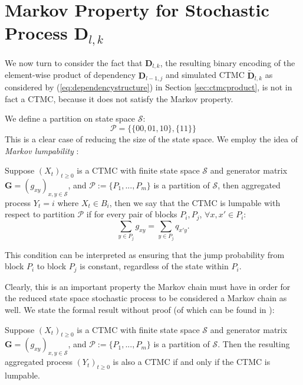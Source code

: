 \section{Markov Property for Stochastic Process $\mathbf{D}_{l, k}$}
\label{app:ctmcprodmarkov}

We now turn to consider the fact that $\mathbf{D}_{l, k}$, the resulting binary encoding of the element-wise product of dependency $\mathbf{D}_{l-1, j}$ and simulated CTMC $\tilde{\mathbf{D}}_{l, k}$ as considered by (\ref{eq:dependencystructure}) in Section \ref{sec:ctmcproduct}, is not in fact a CTMC, because it does not satisfy the Markov property.

We define a partition on state space $\mathcal{S}$:
\begin{equation}
\label{eq:lumpability}
    \mathcal{P} = \{\{00, 01, 10\},\{11\}\}
\end{equation}
This is a clear case of reducing the size of the state space. We employ the idea of \textit{Markov lumpability} \cite{Kemedy1976}:
\begin{definition} [Lumpability]
Suppose $(X_t)_{t\geq 0}$ is a CTMC with finite state space $\mathcal{S}$ and generator matrix $\mathbf{G} = (g_{xy})_{x, y \in \mathcal{S}}$, and $\mathcal{P} := \{P_1, ..., P_m\}$ is a partition of $\mathcal{S}$, then aggregated process $Y_t = i$ where $X_t \in B_i$, then we say that the CTMC is lumpable with respect to partition $\mathcal{P}$ if for every pair of blocks $P_i, P_j$, $\forall x, x' \in P_i$:
\begin{equation}
    \sum_{y\in P_j}g_{xy} = \sum_{y \in P_j}q_{x'y}.
\end{equation}
\end{definition}
This condition can be interpreted as ensuring that the jump probability from block $P_i$ to block $P_j$ is constant, regardless of the state within $P_i$. 

Clearly, this is an important property the Markov chain must have in order for the reduced state space stochastic process to be considered a Markov chain as well. We state the formal result without proof (of which can be found in \cite{Kemedy1976}):
\begin{proposition} 
\label{prop:markovprocesses}
Suppose $(X_t)_{t\geq 0}$ is a CTMC with finite state space $\mathcal{S}$ and generator matrix $\mathbf{G} = (g_{xy})_{x, y \in \mathcal{S}}$, and $\mathcal{P} := \{P_1, ..., P_m\}$ is a partition of $\mathcal{S}$. Then the resulting aggregated process $(Y_t)_{t\geq0}$ is also a CTMC if and only if the CTMC is lumpable.
\end{proposition}

